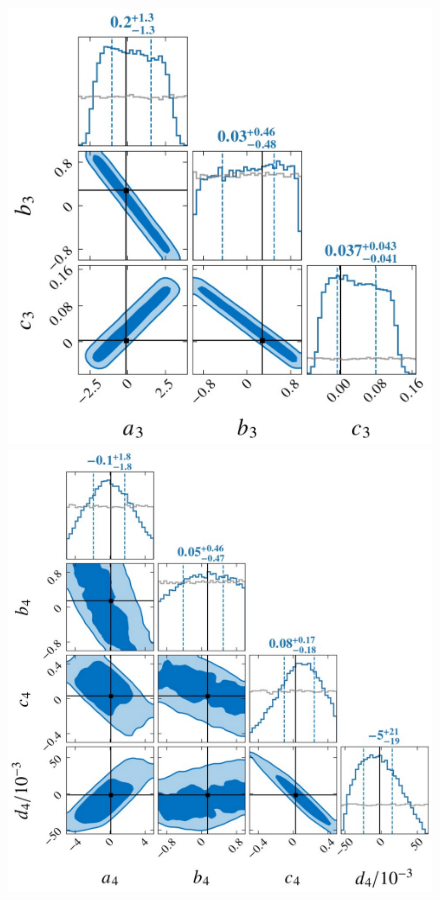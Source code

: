 \documentclass[a4paper,11pt]{article}
\begin{document}
\begin{figure}[t]
    \begin{minipage}[t]{0.49\textwidth}
    \centering
    \includegraphics[width=0.8\linewidth]{fig_Hyper_parameter_3d.pdf}
    \end{minipage}
    \hfill
    \begin{minipage}[t]{0.49\textwidth}
    \centering
    \includegraphics[width=0.8\linewidth]{fig_Hyper_parameter_4d.pdf}
    \end{minipage}

\end{figure}
\end{document}
